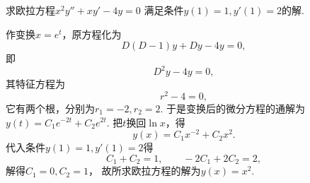 \begin{example}
求欧拉方程\(x^2 y'' + x y' - 4 y = 0\)
满足条件\(y(1) = 1,y'(1) = 2\)的解.
\begin{solution}
作变换\(x = e^t\)，原方程化为\begin{equation*}
	D(D-1)y + Dy - 4y = 0,
\end{equation*}
即\begin{equation*}
	D^2y - 4y = 0,
\end{equation*}
其特征方程为\begin{equation*}
	r^2 - 4 = 0,
\end{equation*}
它有两个根，分别为\(r_1 = -2,r_2 = 2\).
于是变换后的微分方程的通解为\(y(t) = C_1 e^{-2t} + C_2 e^{2t}\).
把\(t\)换回\(\ln x\)，得\begin{equation*}
	y(x) = C_1 x^{-2} + C_2 x^2.
\end{equation*}
代入条件\(y(1) = 1,y'(1) = 2\)得\begin{equation*}
	C_1 + C_2 = 1,
	\qquad
	-2 C_1 + 2 C_2 = 2,
\end{equation*}
解得\(C_1 = 0,C_2 = 1\)，
故所求欧拉方程的解为\(y(x) = x^2\).
\end{solution}
\end{example}
